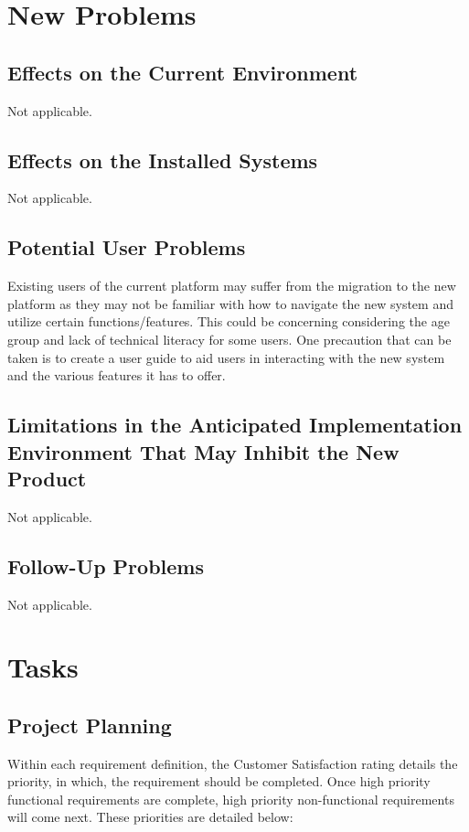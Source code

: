\documentclass[12pt]{article}
\begin{document}
\section{New Problems}
\subsection{Effects on the Current Environment}
Not applicable.
\subsection{Effects on the Installed Systems}
Not applicable.
\subsection{Potential User Problems}

Existing users of the current platform may suffer from the migration
to the new platform as they may not be familiar with how to navigate
the new system and utilize certain functions/features. This could be
concerning considering the age group and lack of technical literacy
for some users. One precaution that can be taken is to create a user
guide to aid users in interacting with the new system and the various
features it has to offer.

\subsection{Limitations in the Anticipated Implementation Environment That May
Inhibit the New Product}
Not applicable.
\subsection{Follow-Up Problems}
Not applicable.

\section{Tasks}
\subsection{Project Planning}

Within each requirement definition, the Customer Satisfaction rating details the
priority, in which, the requirement should be completed. Once high priority
functional requirements are complete, high priority non-functional requirements
will come next. These priorities are detailed below: \\\\
\end{document}

